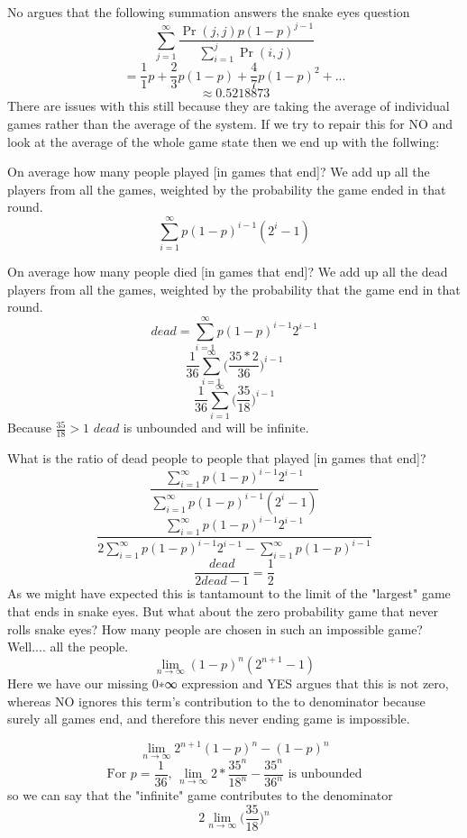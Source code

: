 \documentclass[article,twocolumn]{memoir}
\begin{document}
\begin{itemize}
{        No argues that the following summation answers the snake eyes question
        $$\sum_{j=1}^{\infty} \frac{\Pr(j,j)p(1-p)^{j-1}}{\sum_{i=1}^{j} \Pr(i,j)} $$
        $$= \frac{1}{1}p + \frac{2}{3}p(1-p) + \frac{4}{7}p(1-p)^2 + ...$$
        $$\approx 0.5218873$$
        There are issues with this still because they are taking the average of individual games rather than the average of the system. If we try to repair this for NO and look at the average of the whole game state then we end up with the follwing:

        On average how many people played [in games that end]?
        We add up all the players from all the games, weighted by the probability the game ended in that round.
        $$\sum_{i=1}^\infty p(1-p)^{i-1}(2^i-1)$$
        
        On average how many people died [in games that end]?
        We add up all the dead players from all the games, weighted by the probability that the game end in that round.
        $$dead=\sum_{i=1}^\infty p(1-p)^{i-1}2^{i-1}$$
        $$\frac{1}{36}\sum_{i=1}^\infty \bigg(\frac{35*2}{36}\bigg)^{i-1}$$
        $$\frac{1}{36}\sum_{i=1}^\infty \bigg(\frac{35}{18}\bigg)^{i-1}$$
        Because $\frac{35}{18}>1$ $dead$ is unbounded and will be infinite.
        
        What is the ratio of dead people to people that played [in games that end]?
        $$\frac{\sum_{i=1}^\infty p(1-p)^{i-1}2^{i-1}}{\sum_{i=1}^\infty p(1-p)^{i-1}(2^i-1)}$$
        $$\frac{\sum_{i=1}^\infty p(1-p)^{i-1}2^{i-1}}{2\sum_{i=1}^\infty p(1-p)^{i-1}2^{i-1}-\sum_{i=1}^\infty p(1-p)^{i-1}}$$
        $$\frac{dead}{2dead-1} = \frac{1}{2}$$
        As we might have expected this is tantamount to the limit of the "largest" game that ends in snake eyes.  But what about the zero probability game that never rolls snake eyes? How many people are chosen in such an impossible game? Well.... all the people.
        $$\lim_{n\to\infty}(1-p)^n(2^{n+1}-1)$$
        Here we have our missing 0∗∞ expression and YES argues that this is not zero, whereas NO ignores this term's contribution to the to denominator because surely all games end, and therefore this never ending game is impossible.

        $$\lim_{n\to\infty}2^{n+1}(1-p)^n - (1-p)^n$$
        $$\text{For }p=\frac{1}{36}\text{, }\lim_{n\to\infty}2*\frac{35^n}{18^n} - \frac{35^n}{36^n}\text{ is unbounded}$$
        so we can say that the "infinite" game contributes to the denominator
        $$2\lim_{n\to\infty}\bigg(\frac{35}{18}\bigg)^n$$

}
\end{itemize}
\end{document}

